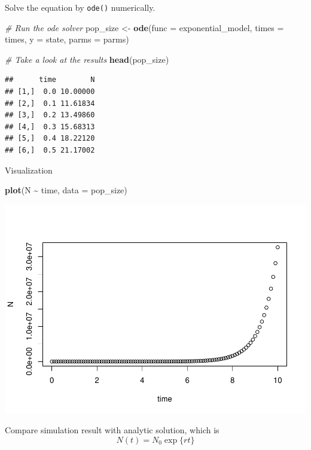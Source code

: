 \documentclass[
]{book}
\newenvironment{Shaded}{\begin{snugshade}}{\end{snugshade}}
\newcommand{\AttributeTok}[1]{\textcolor[rgb]{0.13,0.29,0.53}{#1}}
\newcommand{\CommentTok}[1]{\textcolor[rgb]{0.56,0.35,0.01}{\textit{#1}}}
\newcommand{\FunctionTok}[1]{\textcolor[rgb]{0.13,0.29,0.53}{\textbf{#1}}}
\newcommand{\NormalTok}[1]{#1}
\newcommand{\OtherTok}[1]{\textcolor[rgb]{0.56,0.35,0.01}{#1}}
\newcommand{\SpecialCharTok}[1]{\textcolor[rgb]{0.81,0.36,0.00}{\textbf{#1}}}
\begin{document}
Solve the equation by \texttt{ode()} numerically.

\begin{Shaded}
\begin{Highlighting}[]
\CommentTok{\# Run the ode solver}
\NormalTok{pop\_size }\OtherTok{\textless{}{-}} \FunctionTok{ode}\NormalTok{(}\AttributeTok{func =}\NormalTok{ exponential\_model, }\AttributeTok{times =}\NormalTok{ times, }\AttributeTok{y =}\NormalTok{ state, }\AttributeTok{parms =}\NormalTok{ parms)}

\CommentTok{\# Take a look at the results}
\FunctionTok{head}\NormalTok{(pop\_size)}
\end{Highlighting}
\end{Shaded}

\begin{verbatim}
##      time        N
## [1,]  0.0 10.00000
## [2,]  0.1 11.61834
## [3,]  0.2 13.49860
## [4,]  0.3 15.68313
## [5,]  0.4 18.22120
## [6,]  0.5 21.17002
\end{verbatim}

Visualization

\begin{Shaded}
\begin{Highlighting}[]
\FunctionTok{plot}\NormalTok{(N }\SpecialCharTok{\textasciitilde{}}\NormalTok{ time, }\AttributeTok{data =}\NormalTok{ pop\_size)}
\end{Highlighting}
\end{Shaded}

\includegraphics{bookdown-demo_files/figure-latex/unnamed-chunk-5-1.pdf}

Compare simulation result with analytic solution, which is
\[
N(t) = N_0\exp\{rt\}
\]
\end{document}
